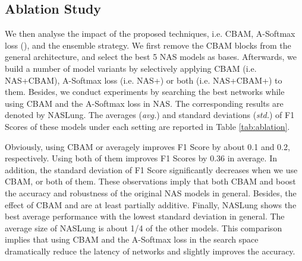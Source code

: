 \documentclass[final,5p,times,twocolumn]{elsarticle}
\begin{document}
\subsection{Ablation Study}
\label{ssec:exp_ablation}
We then analyse the impact of the proposed techniques, i.e. CBAM, A-Softmax loss (), and the ensemble strategy. 
We first remove the CBAM blocks from the general architecture, and select the best 5 NAS models as bases. Afterwards, we build a number of model variants by selectively applying CBAM (i.e. NAS+CBAM), A-Softmax loss (i.e. NAS+) or both (i.e. NAS+CBAM+) to them. 
Besides, we conduct experiments by searching the best networks while using CBAM and the A-Softmax loss in NAS. The corresponding results are denoted by NASLung. 
The averages (\textit{avg.}) and standard deviations (\textit{std.}) of F1 Scores of these models under each setting are reported in Table \ref{tab:ablation}. 


Obviously, using CBAM or  averagely improves F1 Score by about 0.1 and 0.2, respectively. Using both of them improves F1 Scores by 0.36 in average. In addition, the standard deviation  of F1 Score significantly decreases when we use CBAM,  or both of them. These observations imply that both CBAM and  boost the accuracy and robustness of the original NAS models in general. Besides, the effect of CBAM and  are at least partially additive. 
 Finally, NASLung shows the best average performance with the lowest standard deviation in general. The average size of NASLung is about 1/4 of the other models. This comparison implies that using CBAM and the A-Softmax loss in the search space dramatically reduce the latency of networks and slightly improves the accuracy.
\end{document}
